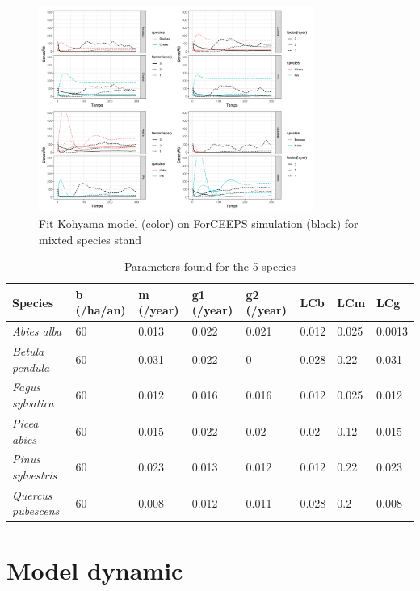 \documentclass{article}
\begin{document}
\begin{figure}[H]
    \centering
    \includegraphics[width=0.8\textwidth]{Figure/plot_fit_multi.png}
    \caption{Fit Kohyama model (color) on ForCEEPS simulation (black) for mixted species stand}
    \label{fig:my_label}
\end{figure}

\begin{table}[H]
\begin{center}
    \begin{tabular}{llllllll}
    \hline
    Species & b (/ha/an) & m (/year) & g1 (/year) & g2 (/year) & LCb & LCm & LCg \\ \hline
    \textit{Abies alba}& 60 & 0.013 & 0.022 & 0.021 & 0.012 & 0.025 & 0.0013 \\
    \textit{Betula pendula} & 60 & 0.031 & 0.022 & 0 & 0.028 & 0.22 & 0.031 \\
    \textit{Fagus sylvatica} & 60 & 0.012 & 0.016 & 0.016 & 0.012 & 0.025 & 0.012 \\
    \textit{Picea abies} & 60 & 0.015 & 0.022 & 0.02 & 0.02 & 0.12& 0.015 \\
    \textit{Pinus sylvestris} & 60 & 0.023 & 0.013 & 0.012 & 0.012 & 0.22 & 0.023 \\
    \textit{Quercus pubescens} & 60 & 0.008 & 0.012 & 0.011  & 0.028 & 0.2 & 0.008 \\ \hline
    \end{tabular}
    \caption{Parameters found for the 5 species}
\end{center}
\end{table}

\section{Model dynamic}
\end{document}
